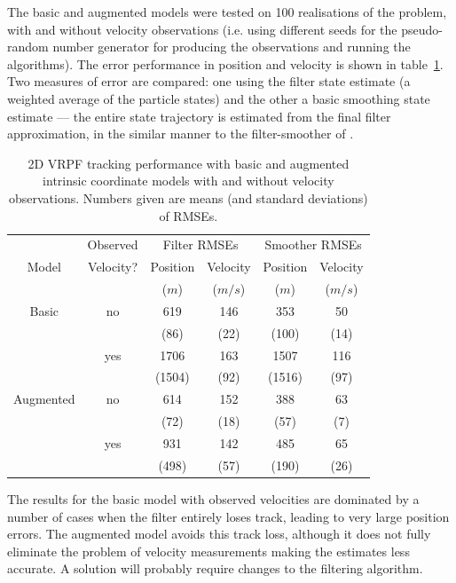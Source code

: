 \documentclass[conference]{IEEEtran}
\begin{document}
The basic and augmented models were tested on 100 realisations of the problem, with and without velocity observations (i.e. using different seeds for the pseudo-random number generator for producing the observations and running the algorithms). The error performance in position and velocity is shown in table~\ref{tab:2D_performance}. Two measures of error are compared: one using the filter state estimate (a weighted average of the particle states) and the other a basic smoothing state estimate --- the entire state trajectory is estimated from the final filter approximation, in the similar manner to the filter-smoother of \cite{Kitagawa1996}.
%
\begin{table}[!b]
\renewcommand{\arraystretch}{1.3}
\caption{2D VRPF tracking performance with basic and augmented intrinsic coordinate models with and without velocity observations. Numbers given are means (and standard deviations) of RMSEs.}
\label{tab:2D_performance}
\centering
\begin{tabular}{|c|c|c|c|c|c|}
\hline
      & Observed  & \multicolumn{2}{c|}{Filter RMSEs}  & \multicolumn{2}{c|}{Smoother RMSEs}  \\
Model & Velocity? & Position & Velocity                & Position & Velocity                  \\
      &           & ($m$)    & ($m/s$)                 & ($m$)    & ($m/s$)                   \\
\hline
Basic     & no  & 619  & 146 & 353  & 50  \\
          &     &(86)  &(22) &(100) &(14) \\
                 \cline{2-6}
          & yes & 1706 & 163 & 1507 & 116 \\
          &     &(1504)&(92) &(1516)&(97) \\
\hline
Augmented & no  & 614 & 152 & 388 & 63 \\
          &     &(72) &(18) &(57) &(7) \\
                 \cline{2-6}
          & yes & 931 & 142 & 485 & 65 \\
          &     &(498)&(57) &(190)&(26)\\
\hline
\end{tabular}
\end{table}
%
The results for the basic model with observed velocities are dominated by a number of cases when the filter entirely loses track, leading to very large position errors. The augmented model avoids this track loss, although it does not fully eliminate the problem of velocity measurements making the estimates less accurate. A solution will probably require changes to the filtering algorithm.
\end{document}

